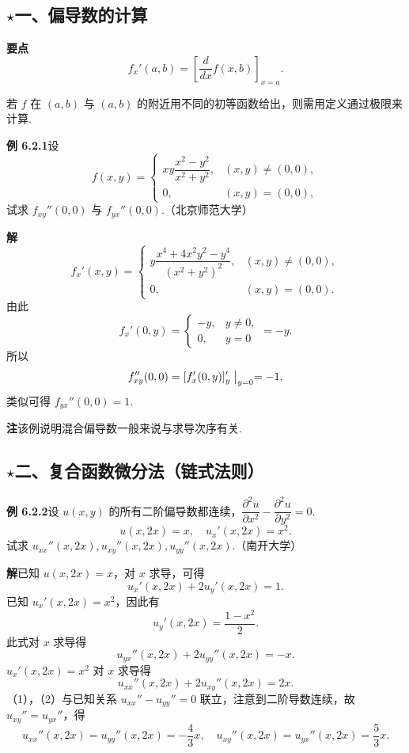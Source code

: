 \documentclass[UTF8,12pt,a4paper,fontset=fandol]{ctexart}
\begin{document}
\subsection*{\ensuremath{\star}一、偏导数的计算}

\noindent\textbf{要点}\quad
\[
  f_x'(a,b)=\left[\frac{d}{dx}f(x,b)\right]_{x=a}.
\]

若 $f$ 在 $(a,b)$ 与 $(a,b)$ 的附近用不同的初等函数给出，则需用定义通过极限来计算.

\noindent\textbf{例 6.2.1}\quad 设
\[
  f(x,y)=
  \begin{cases}
  xy\dfrac{x^2-y^2}{x^2+y^2}, & (x,y)\ne(0,0),\\
  0, & (x,y)=(0,0),
  \end{cases}
\]
试求 $f_{xy}''(0,0)$ 与 $f_{yx}''(0,0)$.（北京师范大学）

\noindent\textbf{解}\quad
\[
  f_x'(x,y)=
  \begin{cases}
  y\dfrac{x^4+4x^2y^2-y^4}{(x^2+y^2)^2}, & (x,y)\ne(0,0),\\
  0, & (x,y)=(0,0).
  \end{cases}
\]
由此
\[
  f_x'(0,y)=
  \begin{cases}
  -y, & y\ne0,\\
  0, & y=0
  \end{cases}
  =-y.
\]
所以
\[
  f_{xy}''(0,0)=[f_x'(0,y)]_y'\bigm|_{y=0}=-1.
\]
类似可得 $f_{yx}''(0,0)=1$.

\noindent\textbf{注}\quad 该例说明混合偏导数一般来说与求导次序有关.

\subsection*{\ensuremath{\star}二、复合函数微分法（链式法则）}

\noindent\textbf{例 6.2.2}\quad 设 $u(x,y)$ 的所有二阶偏导数都连续，$\dfrac{\partial^2u}{\partial x^2}-\dfrac{\partial^2u}{\partial y^2}=0$.
\[
  u(x,2x)=x,\quad u_x'(x,2x)=x^2.
\]
试求 $u_{xx}''(x,2x),u_{xy}''(x,2x),u_{yy}''(x,2x)$.（南开大学）

\noindent\textbf{解}\quad 已知 $u(x,2x)=x$，对 $x$ 求导，可得
\[
  u_x'(x,2x)+2u_y'(x,2x)=1.
\]
已知 $u_x'(x,2x)=x^2$，因此有
\[
  u_y'(x,2x)=\frac{1-x^2}{2}.
\]
此式对 $x$ 求导得
\[
  u_{yx}''(x,2x)+2u_{yy}''(x,2x)=-x. \tag{1}
\]
$u_x'(x,2x)=x^2$ 对 $x$ 求导得
\[
  u_{xx}''(x,2x)+2u_{xy}''(x,2x)=2x. \tag{2}
\]
（1），（2）与已知关系 $u_{xx}''-u_{yy}''=0$ 联立，注意到二阶导数连续，故 $u_{xy}''=u_{yx}''$，得
\[
  u_{xx}''(x,2x)=u_{yy}''(x,2x)=-\frac43x,\quad
  u_{xy}''(x,2x)=u_{yx}''(x,2x)=\frac53x.
\]
\end{document}
